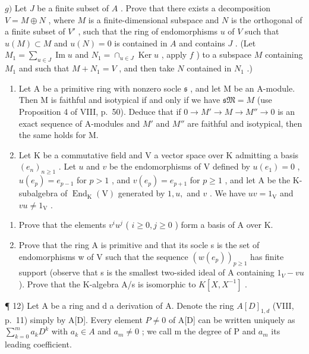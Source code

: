 \(g)\) Let \(J\) be a finite subset of \(A\) . Prove that there exists a decomposition \(V = M \oplus N\) , where \(M\) is a finite-dimensional subspace and \(N\) is the orthogonal of a finite subset of \(V'\) , such that the ring of endomorphisms \(u\) of \(V\) such that \(u(M) \subset M\) and \(u(N) = 0\) is contained in \(A\) and contains \(J\) . (Let \(M_1 = \sum_{u \in J} \operatorname{Im} u\) and \(N_1 = \cap_{u \in J} \operatorname{Ker} u\) , apply \(f\) ) to a subspace \(M\) containing \(M_1\) and such that \(M + N_1 = V\) , and then take \(N\) contained in \(N_1\) .)

\begin{enumerate}
\def\labelenumi{\arabic{enumi})}
\setcounter{enumi}{9}
\item
  Let A be a primitive ring with nonzero socle \(\mathfrak{s}\) , and let M be an A-module. Then M is faithful and isotypical if and only if we have \(\mathfrak{sM} = M\) (use Proposition 4 of VIII, p.~50). Deduce that if \(0 \to M' \to M \to M'' \to 0\) is an exact sequence of A-modules and \(M'\) and \(M''\) are faithful and isotypical, then the same holds for M.
\item
  Let \(\mathrm{K}\) be a commutative field and \(\mathrm{V}\) a vector space over \(\mathrm{K}\) admitting a basis \((e_n)_{n\geqslant 1}\) . Let \(u\) and \(v\) be the endomorphisms of \(\mathrm{V}\) defined by \(u(e_1) = 0\) , \(u(e_p) = e_{p - 1}\) for \(p > 1\) , and \(v(e_p) = e_{p + 1}\) for \(p\geqslant 1\) , and let \(\mathrm{A}\) be the K-subalgebra of \(\operatorname {End}_{\mathrm{K}}(\mathrm{V})\) generated by \(1, u,\) and \(v\) . We have \(uv = 1_{\mathrm{V}}\) and \(vu\neq 1_{\mathrm{V}}\) .
\end{enumerate}

\begin{enumerate}
\def\labelenumi{\alph{enumi})}
\item
  Prove that the elements \(v^i u^j\) ( \(i \geqslant 0, j \geqslant 0\) ) form a basis of A over K.
\item
  Prove that the ring A is primitive and that its socle s is the set of endomorphisms w of V such that the sequence \((w(e_{p}))_{p\geqslant1}\) has finite support (observe that s is the smallest two-sided ideal of A containing \(1_{V}-vu\) ). Prove that the K-algebra A/s is isomorphic to \(K[X,X^{-1}]\) .
\end{enumerate}

¶ 12) Let A be a ring and d a derivation of A. Denote the ring \(A[D]_{1,d}\) (VIII, p.~11) simply by A{[}D{]}. Every element \(P \neq 0\) of A{[}D{]} can be written uniquely as \(\sum_{k=0}^{m} a_k D^k\) with \(a_k \in A\) and \(a_m \neq 0\) ; we call m the degree of P and \(a_m\) its leading coefficient.

